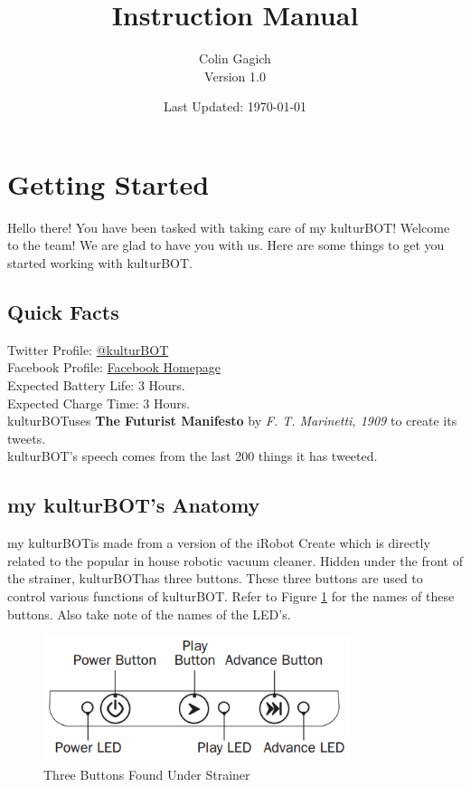 \documentclass[]{article}
\title{\kbspace Instruction Manual}
\author{Colin Gagich \\ \textnormal Version 1.0}
\date{Last Updated: \today}
\newcommand{\kb}{kulturBOT}
\newcommand{\kbspace}{\kb \space}
\newcommand{\mykb}{my \kb}
\newcommand{\mykbspace}{\mykb \space}
\begin{document}
\maketitle

\newpage

\tableofcontents
\newpage

\section{Getting Started}
Hello there! You have been tasked with taking care of \mykb! Welcome to the team! We are glad to have you with us. Here are some things to get you started working with \kb.

\subsection{Quick Facts}

Twitter Profile: \href{https://twitter.com/kulturBOT}{@kulturBOT} \\
Facebook Profile: \href{https://www.facebook.com/thekulturbot}{Facebook Homepage}\\
Expected Battery Life: 3 Hours.\\
Expected Charge Time: 3 Hours.\\
\kbspace uses \textbf{The Futurist Manifesto} by \textit{F. T. Marinetti, 1909} to create its tweets.\\
\kb 's speech comes from the last 200 things it has tweeted.

\subsection{\mykb 's Anatomy}

\mykbspace is made from a version of the iRobot Create which is directly related to the popular in house robotic vacuum cleaner. Hidden under the front of the strainer, \kbspace has three buttons. These three buttons are used to control various functions of \kb. Refer to Figure \ref{3button} for the names of these buttons. Also take note of the names of the LED's.

	\begin{figure}[h!]
		\centering
	    \includegraphics[width=0.8\textwidth]{img/3button.png}
	    \caption{Three Buttons Found Under Strainer}
	    \label{3button}
	\end{figure}
\end{document}
